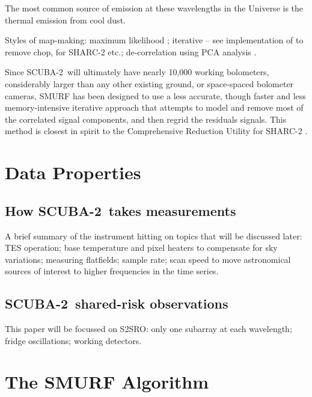 \documentclass[useAMS,usenatbib,usegraphicx,nofootinbib]{mn2e}
\newcommand{\scuba}{SCUBA-2}
\begin{document}
The most common source of emission at these wavelengths in the
Universe is the thermal emission from cool dust.


Styles of map-making: maximum likelihood
\citep[e.g.,][]{patanchon2008}; iterative -- see \citet{johnstone2000}
implementation of \citet{wright1996} to remove chop,
\citet{kovacs2008} for SHARC-2 etc.; de-correlation using PCA
analysis \citep[e.g.][]{laurent2005,scott2008}.

Since \scuba\ will ultimately have nearly 10,000 working bolometers,
considerably larger than any other existing ground, or space-spaced
bolometer cameras, SMURF has been designed to use a less accurate,
though faster and less memory-intensive iterative approach that
attempts to model and remove most of the correlated signal components,
and then regrid the residuals signals. This method is closest in
spirit to the Comprehensive Reduction Utility for SHARC-2
\citep[CRUSH,][]{kovacs2008}.


\section{Data Properties}
\label{sec:data}

\subsection{How \scuba\ takes measurements}

A brief summary of the instrument hitting on topics that will be
discussed later: TES operation; base temperature and pixel heaters to
compensate for sky variations; measuring flatfields; sample rate; scan
speed to move astronomical sources of interest to higher frequencies
in the time series.

\subsection{\scuba\ shared-risk observations}

This paper will be focussed on S2SRO: only one subarray at each
wavelength; fridge oscillations; working detectors.


\section{The SMURF Algorithm}
\label{sec:data}
\end{document}
